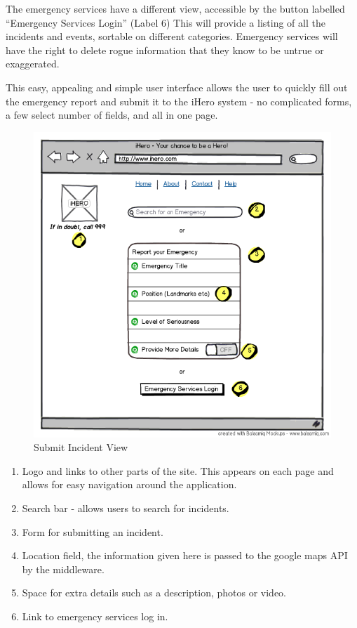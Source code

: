 \documentclass{sig-alt-release2}
\begin{document}
The emergency services have a different view, accessible by the button labelled ``Emergency Services Login'' (Label 6) This will provide a listing of all the incidents and events, sortable on different categories. Emergency services will have the right to delete rogue information that they know to be untrue or exaggerated.

This easy, appealing and simple user interface allows the user to quickly fill out the emergency report and submit it to the iHero system - no complicated forms, a few select number of fields, and all in one page.

\begin{figure}
  \caption{Submit Incident View}
  \begin{center}
    \includegraphics[scale=0.4]{img/1.png}
  \end{center}
\end{figure}

\begin{enumerate}
  \item Logo and links to other parts of the site. This appears on each page and allows for easy navigation around the application.
  \item Search bar - allows users to search for incidents.
  \item Form for submitting an incident.
  \item Location field, the information given here is passed to the google maps API by the middleware.
  \item Space for extra details such as a description, photos or video.
  \item Link to emergency services log in.
\end{enumerate}
\end{document}
